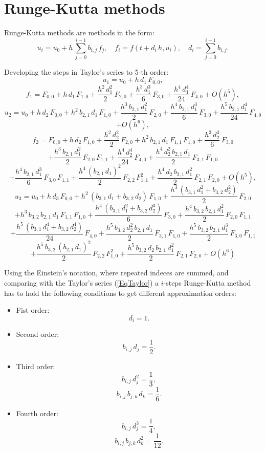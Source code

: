 \documentclass[a4paper]{article}
\newcommand{\EQ}[2]{\begin{equation}#1\label{#2}\end{equation}}
\newcommand{\PA}[1]{\left(#1\right)}
\begin{document}
\section{Runge-Kutta methods}

Runge-Kutta methods are methods in the form:
\EQ
{
	u_i=u_0+h\,\sum_{j=0}^{i-1}b_{i,j}\,f_j,\quad
	f_i=f\PA{t+d_i\,h,u_i},\quad
	d_i=\sum_{j=0}^{i-1}b_{i,j}.
}{EqRK}

Developing the steps in Taylor's series to 5-th order:
\[u_1=u_0+h\,d_1\,F_{0,0},\]
\[
	f_1=F_{0,0}+h\,d_1\,F_{1,0}+\frac{h^2\,d_1^2}{2}\,F_{2,0}
	+\frac{h^3\,d_1^3}{6}\,F_{3,0}+\frac{h^4\,d_1^4}{24}\,F_{4,0}+O\PA{h^5},
\]
\[
	u_2=u_0+h\,d_2\,F_{0,0}+h^2\,b_{2,1}\,d_1\,F_{1,0}
	+\frac{h^3\,b_{2,1}\,d_1^2}{2}\,F_{2,0}
	+\frac{h^4\,b_{2,1}\,d_1^3}{6}\,F_{3,0}
	+\frac{h^5\,b_{2,1}\,d_1^4}{24}\,F_{4,0}
\]
\[
	+O\PA{h^6},
\]
\[
	f_2=F_{0,0}+h\,d_2\,F_{1,0}+\frac{h^2\,d_2^2}{2}\,F_{2,0}
	+h^2\,b_{2,1}\,d_{1}\,F_{1,1}\,F_{1,0}+\frac{h^3\,d_2^3}{6}\,F_{3,0}
\]
\[
	+\frac{h^3\,b_{2,1}\,d_1^2}{2}\,F_{2,0}\,F_{1,1}
	+\frac{h^4\,d_2^4}{24}\,F_{4,0}
	+\frac{h^4\,d_2^2\,b_{2,1}\,d_1}{2}\,F_{3,1}\,F_{1,0}
\]
\[
	+\frac{h^4\,b_{2,1}\,d_1^3}{6}\,F_{3,0}\,F_{1,1}
	+\frac{h^4\,\PA{b_{2,1}\,d_1}^2}{2}\,F_{2,2}\,F_{1,1}^2
	+\frac{h^4\,d_2\,b_{2,1}\,d_1^2}{2}\,F_{2,1}\,F_{2,0}
	+O\PA{h^5},
\]
\[
	u_3=u_0+h\,d_3\,F_{0,0}+h^2\,\PA{b_{3,1}\,d_1+b_{3,2}\,d_2}\,F_{1,0}
	+\frac{h^3\,\PA{b_{3,1}\,d_1^2+b_{3,2}\,d_2^2}}{2}\,F_{2,0}
\]
\[
	+h^3\,b_{3,2}\,b_{2,1}\,d_{1}\,F_{1,1}\,F_{1,0}
	+\frac{h^4\,\PA{b_{3,1}\,d_1^2+b_{3,2}\,d_2^3}}{6}\,F_{3,0}
	+\frac{h^4\,b_{3,2}\,b_{2,1}\,d_1^2}{2}\,F_{2,0}\,F_{1,1}
\]
\[
	+\frac{h^5\,\PA{b_{3,1}\,d_1^4+b_{3,2}\,d_2^4}}{24}\,F_{4,0}
	+\frac{h^5\,b_{3,2}\,d_2^2\,b_{2,1}\,d_1}{2}\,F_{3,1}\,F_{1,0}
	+\frac{h^5\,b_{3,2}\,b_{2,1}\,d_1^3}{2}\,F_{3,0}\,F_{1,1}
\]
\[
	+\frac{h^5\,b_{3,2}\,\PA{b_{2,1}\,d_1}^2}{2}\,F_{2,2}\,F_{1,0}^2
	+\frac{h^5\,b_{3,2}\,d_2\,b_{2,1}\,d_1^2}{2}\,F_{2,1}\,F_{2,0}
	+O\PA{h^6}
\]

Using the Einstein's notation, where repeated indeces are summed, and comparing
with the Taylor's series (\ref{EqTaylor}) a $i$-steps Runge-Kutta method has to
hold the following conditions to get different approximation orders:
\begin{itemize}
\item Fist order:
	\EQ{d_i=1.}{EqRKI}
\item Second order:
	\EQ{b_{i,j}\,d_j=\frac12.}{EqRKII}
\item Third order:
	\[b_{i,j}\,d_j^2=\frac13,\]
	\EQ{b_{i,j}\,b_{j,k}\,d_k=\frac16.}{EqRKIII}
\item Fourth order:
	\[b_{i,j}\,d_j^3=\frac14,\]
	\EQ{b_{i,j}\,b_{j,k}\,d_k^2=\frac1{12}.}{EqRKIV}
\end{itemize}
\end{document}
